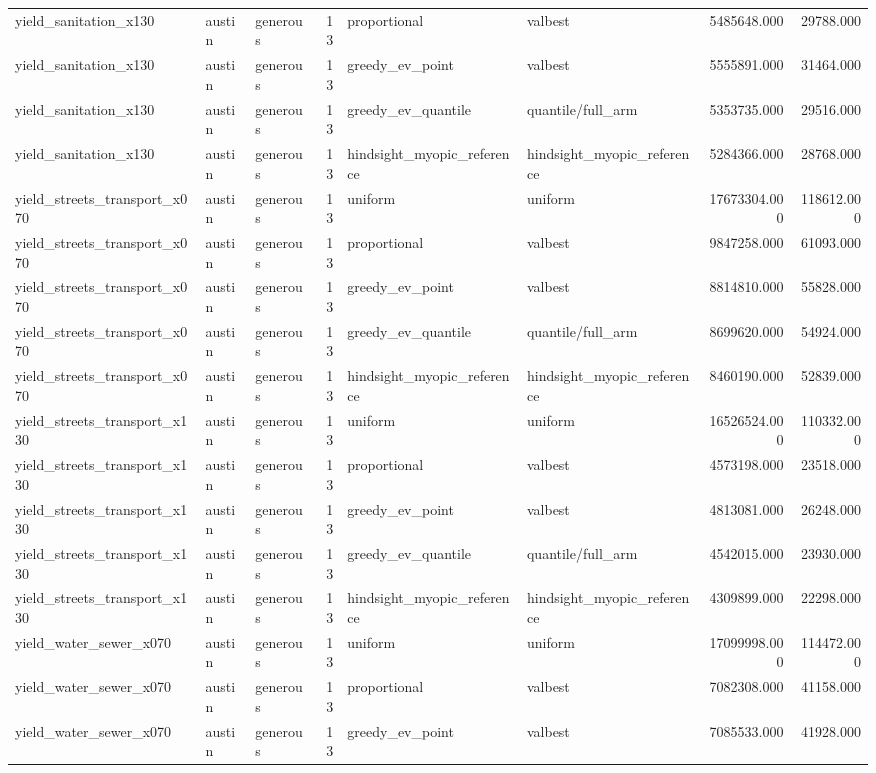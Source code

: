 \begin{tabular}{lllrllrr}
yield\_sanitation\_x130 & austin & generous & 13 & proportional & valbest & 5485648.000 & 29788.000 \\
yield\_sanitation\_x130 & austin & generous & 13 & greedy\_ev\_point & valbest & 5555891.000 & 31464.000 \\
yield\_sanitation\_x130 & austin & generous & 13 & greedy\_ev\_quantile & quantile/full\_arm & 5353735.000 & 29516.000 \\
yield\_sanitation\_x130 & austin & generous & 13 & hindsight\_myopic\_reference & hindsight\_myopic\_reference & 5284366.000 & 28768.000 \\
yield\_streets\_transport\_x070 & austin & generous & 13 & uniform & uniform & 17673304.000 & 118612.000 \\
yield\_streets\_transport\_x070 & austin & generous & 13 & proportional & valbest & 9847258.000 & 61093.000 \\
yield\_streets\_transport\_x070 & austin & generous & 13 & greedy\_ev\_point & valbest & 8814810.000 & 55828.000 \\
yield\_streets\_transport\_x070 & austin & generous & 13 & greedy\_ev\_quantile & quantile/full\_arm & 8699620.000 & 54924.000 \\
yield\_streets\_transport\_x070 & austin & generous & 13 & hindsight\_myopic\_reference & hindsight\_myopic\_reference & 8460190.000 & 52839.000 \\
yield\_streets\_transport\_x130 & austin & generous & 13 & uniform & uniform & 16526524.000 & 110332.000 \\
yield\_streets\_transport\_x130 & austin & generous & 13 & proportional & valbest & 4573198.000 & 23518.000 \\
yield\_streets\_transport\_x130 & austin & generous & 13 & greedy\_ev\_point & valbest & 4813081.000 & 26248.000 \\
yield\_streets\_transport\_x130 & austin & generous & 13 & greedy\_ev\_quantile & quantile/full\_arm & 4542015.000 & 23930.000 \\
yield\_streets\_transport\_x130 & austin & generous & 13 & hindsight\_myopic\_reference & hindsight\_myopic\_reference & 4309899.000 & 22298.000 \\
yield\_water\_sewer\_x070 & austin & generous & 13 & uniform & uniform & 17099998.000 & 114472.000 \\
yield\_water\_sewer\_x070 & austin & generous & 13 & proportional & valbest & 7082308.000 & 41158.000 \\
yield\_water\_sewer\_x070 & austin & generous & 13 & greedy\_ev\_point & valbest & 7085533.000 & 41928.000 \\

\end{tabular}
